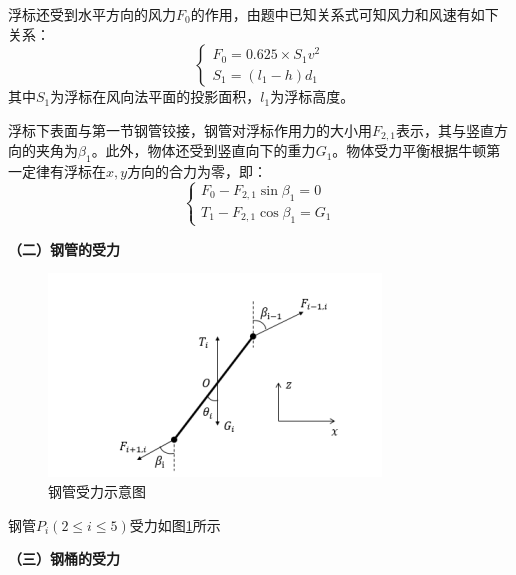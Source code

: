 \documentclass{article}
\numberwithin{equation}{subsection}
\begin{document}
浮标还受到水平方向的风力$F_{0}$的作用，由题中已知关系式可知风力和风速有如下关系：
\begin{equation}
\begin{cases}
F_{0}=0.625\times S_{1}v^{2}\\
S_{1}=(l_{1}-h)d_{1}
\end{cases}
\end{equation}
其中$S_{1}$为浮标在风向法平面的投影面积，$l_{1}$为浮标高度。

浮标下表面与第一节钢管铰接，钢管对浮标作用力的大小用$F_{2,1}$表示，其与竖直方向的夹角为$\beta_{1}$。此外，物体还受到竖直向下的重力$G_{1}$。物体受力平衡根据牛顿第一定律有浮标在$x,y$方向的合力为零，即：
\begin{equation}
\begin{cases}
F_{0}-F_{2,1}\sin\beta_{1}=0\\
T_{1}-F_{2,1}\cos\beta_{1}=G_{1}
\end{cases}
\end{equation}



\begin{flushleft}
\textbf{（二）钢管的受力}
\end{flushleft}
\begin{figure}[H]
  \centering
  \includegraphics[scale=0.6]{钢管受力.png}
  \caption{\kaishu 钢管受力示意图}
  \label{钢管受力}
\end{figure}

钢管$P_{i}(2\le i\le5)$受力如图\ref{钢管受力}所示

\begin{flushleft}
\textbf{（三）钢桶的受力}
\end{flushleft}
\end{document}
